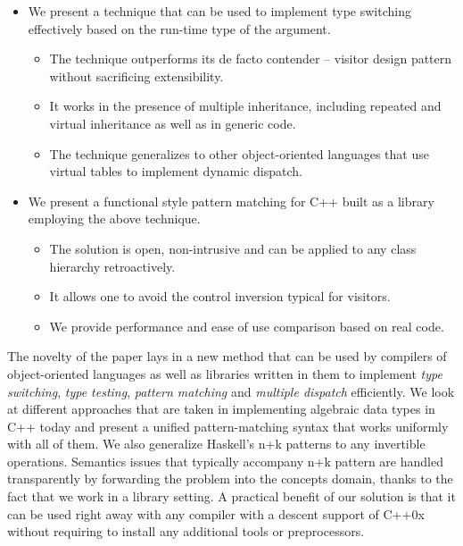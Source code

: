 \documentclass[preprint]{sigplanconf}
\begin{document}
\begin{itemize}
\item We present a technique that can be used to implement type switching 
      effectively based on the run-time type of the argument. 
  \begin{itemize}
  \item The technique outperforms its de facto contender -- visitor design 
        pattern without sacrificing extensibility.
  \item It works in the presence of multiple inheritance, including repeated and 
        virtual inheritance as well as in generic code.
  \item The technique generalizes to other object-oriented languages that use 
        virtual tables to implement dynamic dispatch.
  \end{itemize}
\item We present a functional style pattern matching for C++ built as a library 
      employing the above technique.
  \begin{itemize}
  \item The solution is open, non-intrusive and can be applied to any class 
        hierarchy retroactively.
  \item It allows one to avoid the control inversion typical for visitors.
  \item We provide performance and ease of use comparison based on real code.
  \end{itemize}
\end{itemize}

The novelty of the paper lays in a new method that can be used by compilers of 
object-oriented languages as well as libraries written in them to implement 
\emph{type switching}, \emph{type testing}, \emph{pattern matching} and 
\emph{multiple dispatch} efficiently. We look at different approaches that are 
taken in implementing algebraic data types in C++ today and present a unified 
pattern-matching syntax that works uniformly with all of them. We also 
generalize Haskell's n+k patterns to any invertible operations. Semantics issues 
that typically accompany n+k pattern are handled transparently by forwarding the 
problem into the concepts domain, thanks to the fact that we work in a library 
setting. A practical benefit of our solution is that it can be used right away 
with any compiler with a descent support of C++0x without requiring to install 
any additional tools or preprocessors.
\end{document}
